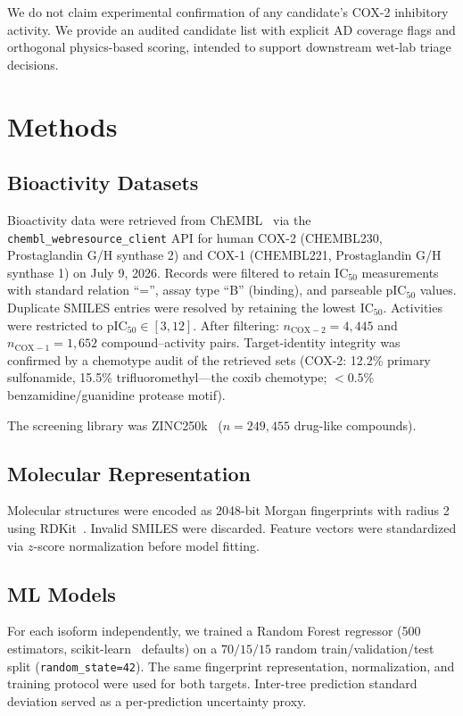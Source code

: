 \documentclass[11pt]{article}
\begin{document}
We do not claim experimental confirmation of any candidate's COX-2 inhibitory activity. We provide an audited candidate list with explicit AD coverage flags and orthogonal physics-based scoring, intended to support downstream wet-lab triage decisions.

\section{Methods}

\subsection{Bioactivity Datasets}

Bioactivity data were retrieved from ChEMBL~\cite{mendez2019} via the \texttt{chembl\_webresource\_client} API for human COX-2 (CHEMBL230, Prostaglandin G/H synthase 2) and COX-1 (CHEMBL221, Prostaglandin G/H synthase 1) on July 9, 2026. Records were filtered to retain IC$_{50}$ measurements with standard relation ``='', assay type ``B'' (binding), and parseable pIC$_{50}$ values. Duplicate SMILES entries were resolved by retaining the lowest IC$_{50}$. Activities were restricted to pIC$_{50}\in[3,12]$. After filtering: $n_{\mathrm{COX-2}}=4{,}445$ and $n_{\mathrm{COX-1}}=1{,}652$ compound--activity pairs. Target-identity integrity was confirmed by a chemotype audit of the retrieved sets (COX-2: 12.2\% primary sulfonamide, 15.5\% trifluoromethyl---the coxib chemotype; $<0.5\%$ benzamidine/guanidine protease motif).

The screening library was ZINC250k~\cite{irwin2020} ($n=249{,}455$ drug-like compounds).

\subsection{Molecular Representation}

Molecular structures were encoded as 2048-bit Morgan fingerprints with radius 2~\cite{rogers2010} using RDKit~\cite{landrum2006}. Invalid SMILES were discarded. Feature vectors were standardized via $z$-score normalization before model fitting.

\subsection{ML Models}

For each isoform independently, we trained a Random Forest regressor (500 estimators, scikit-learn~\cite{pedregosa2011} defaults) on a $70/15/15$ random train/validation/test split (\texttt{random\_state=42}). The same fingerprint representation, normalization, and training protocol were used for both targets. Inter-tree prediction standard deviation served as a per-prediction uncertainty proxy.
\end{document}
